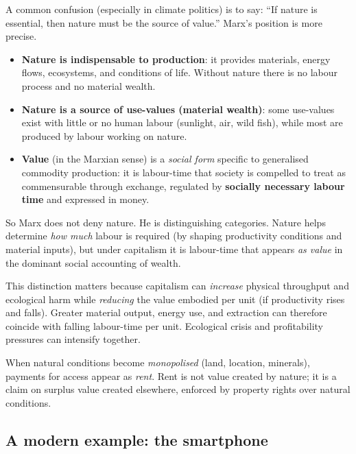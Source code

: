 A common confusion (especially in climate politics) is to say: ``If nature is essential,
then nature must be the source of value.'' Marx’s position is more precise.

\begin{itemize}[leftmargin=1.5em]
  \item \textbf{Nature is indispensable to production}: it provides materials, energy flows,
  ecosystems, and conditions of life. Without nature there is no labour process and no material wealth.
  \item \textbf{Nature is a source of use-values (material wealth)}: some use-values exist with little or
  no human labour (sunlight, air, wild fish), while most are produced by labour working on nature.
  \item \textbf{Value} (in the Marxian sense) is a \emph{social form} specific to generalised commodity
  production: it is labour-time that society is compelled to treat as commensurable through exchange,
  regulated by \textbf{socially necessary labour time} and expressed in money.
\end{itemize}

So Marx does not deny nature. He is distinguishing categories. Nature helps determine \emph{how much}
labour is required (by shaping productivity conditions and material inputs), but under capitalism it is
labour-time that appears \emph{as value} in the dominant social accounting of wealth.

This distinction matters because capitalism can \emph{increase} physical throughput and ecological harm
while \emph{reducing} the value embodied per unit (if productivity rises and \snlt{} falls). Greater material output, energy use, and extraction can therefore coincide with falling
labour-time per unit. Ecological crisis and profitability pressures can intensify together.

When natural conditions become \emph{monopolised} (land, location, minerals), payments for access appear as
\emph{rent}. Rent is not value created by nature; it is a claim on surplus value created elsewhere, enforced
by property rights over natural conditions.\cite{Marx1894}


\subsection{A modern example: the smartphone}

